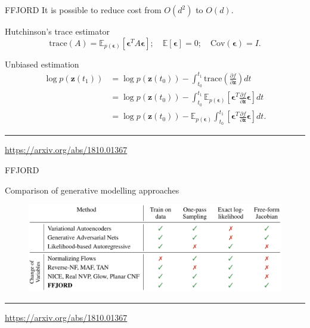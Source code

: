 \documentclass{beamer}
\newcommand{\bz}{\mathbf{z}}
\newcommand{\bepsilon}{\boldsymbol{\epsilon}}
\begin{document}
\begin{frame}{FFJORD}
	It is possible to reduce cost from $O(d^2)$ to $O(d)$.
	\begin{block}{Hutchinson's trace estimator}
	\[
	    \text{trace}(A) = \mathbb{E}_{p(\bepsilon)} \left[ \bepsilon^T A \bepsilon \right]; \quad \mathbb{E} [\bepsilon] = 0; \quad \text{Cov} (\bepsilon) = I.
	\]
	\end{block}
	\begin{block}{Unbiased estimation}
		\vspace{-0.3cm}
	\begin{align*}
	    \log p(\bz(t_1)) &= \log p(\bz(t_0)) - \int_{t_0}^{t_1} \text{trace} \left( \frac{\partial f}{\partial \bz} \right) dt \\
	    &= \log p(\bz(t_0)) - \int_{t_0}^{t_1} \mathbb{E}_{p(\bepsilon)} \left[ \bepsilon^T \frac{\partial f}{\partial \bz} \bepsilon \right] dt \\
	    &= \log p(\bz(t_0)) - \mathbb{E}_{p(\bepsilon)} \int_{t_0}^{t_1} \left[ \bepsilon^T \frac{\partial f}{\partial \bz} \bepsilon \right] dt.
	\end{align*}
	\end{block}
	\vspace{0.3cm}

	\vfill
	\hrule\medskip
	{\scriptsize \href{https://arxiv.org/abs/1810.01367}{https://arxiv.org/abs/1810.01367}} 
\end{frame}
\begin{frame}{FFJORD}
	\begin{block}{Comparison of generative modelling approaches}
		\begin{figure}
		    \centering
		    \includegraphics[width=\linewidth]{figs/flow_comparison.png}
		\end{figure}
	\end{block}
	\vspace{1cm}
	
	\hrule\medskip
	{\scriptsize \href{https://arxiv.org/abs/1810.01367}{https://arxiv.org/abs/1810.01367}} 
\end{frame}
\end{document}
